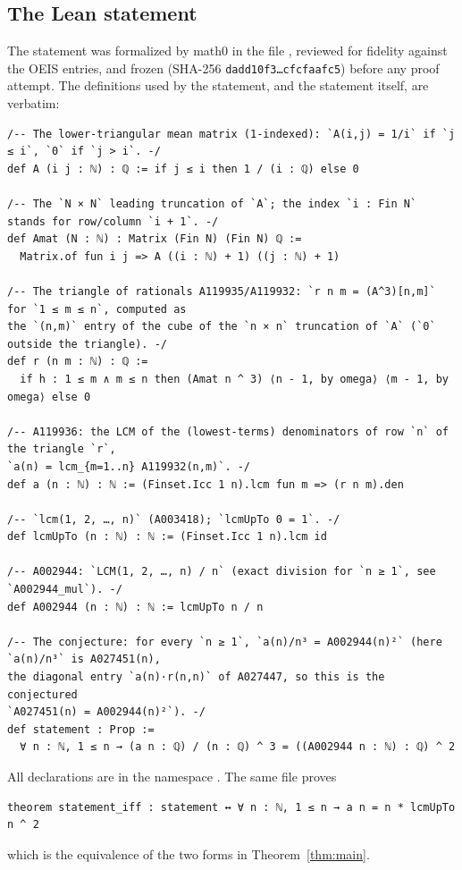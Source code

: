 \documentclass[11pt]{amsart}
\theoremstyle{plain}
\theoremstyle{definition}
\begin{document}
\subsection*{The Lean statement}
The statement was formalized by math0 in the file , reviewed for fidelity against the OEIS entries, and frozen (SHA-256 \texttt{dadd10f3\ldots cfcfaafc5}) before any proof attempt. The definitions used by the statement, and the statement itself, are verbatim:
\begin{lstlisting}[basicstyle=\ttfamily\scriptsize]
/-- The lower-triangular mean matrix (1-indexed): `A(i,j) = 1/i` if `j ≤ i`, `0` if `j > i`. -/
def A (i j : ℕ) : ℚ := if j ≤ i then 1 / (i : ℚ) else 0

/-- The `N × N` leading truncation of `A`; the index `i : Fin N` stands for row/column `i + 1`. -/
def Amat (N : ℕ) : Matrix (Fin N) (Fin N) ℚ :=
  Matrix.of fun i j => A ((i : ℕ) + 1) ((j : ℕ) + 1)

/-- The triangle of rationals A119935/A119932: `r n m = (A^3)[n,m]` for `1 ≤ m ≤ n`, computed as
the `(n,m)` entry of the cube of the `n × n` truncation of `A` (`0` outside the triangle). -/
def r (n m : ℕ) : ℚ :=
  if h : 1 ≤ m ∧ m ≤ n then (Amat n ^ 3) ⟨n - 1, by omega⟩ ⟨m - 1, by omega⟩ else 0

/-- A119936: the LCM of the (lowest-terms) denominators of row `n` of the triangle `r`,
`a(n) = lcm_{m=1..n} A119932(n,m)`. -/
def a (n : ℕ) : ℕ := (Finset.Icc 1 n).lcm fun m => (r n m).den

/-- `lcm(1, 2, …, n)` (A003418); `lcmUpTo 0 = 1`. -/
def lcmUpTo (n : ℕ) : ℕ := (Finset.Icc 1 n).lcm id

/-- A002944: `LCM(1, 2, …, n) / n` (exact division for `n ≥ 1`, see `A002944_mul`). -/
def A002944 (n : ℕ) : ℕ := lcmUpTo n / n

/-- The conjecture: for every `n ≥ 1`, `a(n)/n³ = A002944(n)²` (here `a(n)/n³` is A027451(n),
the diagonal entry `a(n)·r(n,n)` of A027447, so this is the conjectured
`A027451(n) = A002944(n)²`). -/
def statement : Prop :=
  ∀ n : ℕ, 1 ≤ n → (a n : ℚ) / (n : ℚ) ^ 3 = ((A002944 n : ℕ) : ℚ) ^ 2
\end{lstlisting}
All declarations are in the namespace . The same file proves
\begin{lstlisting}
theorem statement_iff : statement ↔ ∀ n : ℕ, 1 ≤ n → a n = n * lcmUpTo n ^ 2
\end{lstlisting}
which is the equivalence of the two forms in Theorem~\ref{thm:main}.
\end{document}
